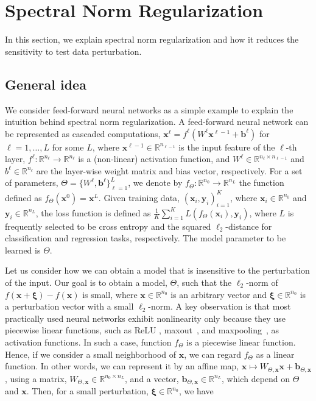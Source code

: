 \section{Spectral Norm Regularization}\label{sec:method}

In this section, we explain spectral norm regularization and how it reduces the sensitivity to test data perturbation.

\subsection{General idea}\label{subsec:intuition}
We consider feed-forward neural networks as a simple example to explain the intuition behind spectral norm regularization. A feed-forward neural network can be represented as cascaded computations, ${\bm x}^\ell = f^\ell(W^\ell{\bm x}^{\ell-1} + {\bm b}^\ell)$ for $\ell = 1,\ldots,L$ for some $L$, where ${\bm x}^{\ell-1} \in \mathbb{R}^{n_{\ell-1}}$ is the input feature of the $\ell$-th layer, $f^\ell:\mathbb{R}^{n_\ell}  \to \mathbb{R}^{n_\ell}$ is a (non-linear) activation function, and $W^\ell \in \mathbb{R}^{n_{\ell} \times n_{\ell-1}}$ and $b^\ell \in \mathbb{R}^{n_\ell}$ are the layer-wise weight matrix and bias vector, respectively. For a set of parameters, $\Theta = \{W^\ell,{\bm b}^\ell\}_{\ell=1}^L$, we denote by $f_\Theta:\mathbb{R}^{n_0} \to \mathbb{R}^{n_L}$ the function defined as $f_\Theta({\bm x}^0) = {\bm x}^L$. Given training data, $({\bm x}_i,{\bm y}_i)_{i=1}^K$, where ${\bm x}_i \in \mathbb{R}^{n_0}$ and ${\bm y}_i \in \mathbb{R}^{n_L}$, the loss function is defined as $\frac{1}{K}\sum_{i=1}^K L(f_\Theta({\bm x}_i),{\bm y}_i)$, where $L$ is frequently selected to be cross entropy and the squared $\ell_2$-distance for classification and regression tasks, respectively. The model parameter to be learned is $\Theta$.

Let us consider how we can obtain a model that is insensitive to the perturbation of the input. Our goal is to obtain a model, $\Theta$, such that the $\ell_2$-norm of $f({\bm x} + {\bm \xi}) - f({\bm x})$ is small, where ${\bm x} \in \mathbb{R}^{n_0}$ is an arbitrary vector and ${\bm \xi} \in \mathbb{R}^{n_0}$ is a perturbation vector with a small $\ell_2$-norm.
A key observation is that most practically used neural networks exhibit nonlinearity only because they use piecewise linear functions, such as ReLU , maxout~\cite{Goodfellow:2013tf}, and maxpooling~\cite{Ranzato:2007eb}, as activation functions. In such a case, function $f_\Theta$ is a piecewise linear function. Hence, if we consider a small neighborhood of ${\bm x}$, we can regard $f_\Theta$ as a linear function. In other words, we can represent it by an affine map, ${\bm x} \mapsto W_{\Theta,{\bm x}}{\bm x} + {\bm b}_{\Theta,{\bm x}}$, using a matrix, $W_{\Theta,{\bm x}}  \in \mathbb{R}^{n_0\times n_L}$, and a vector, ${\bm b}_{\Theta,{\bm x}} \in \mathbb{R}^{n_L}$, which depend on $\Theta$ and ${\bm x}$. Then, for a small perturbation, ${\bm \xi} \in \mathbb{R}^{n_0}$, we have

